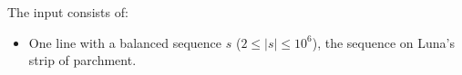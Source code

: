 
	The input consists of:
	\begin{itemize}
		\item One line with a balanced sequence $s$ ($2\leq |s|\leq
			10^6$),
			the sequence on Luna's strip of parchment.
	\end{itemize}
